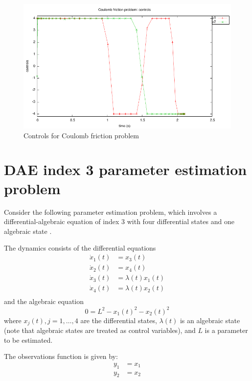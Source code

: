 \documentclass[a4paper,11pt]{report}    %
\begin{document}
\begin{figure}
  \centering
  \includegraphics{../examples/coulomb/coulomb_control}
  \caption{Controls for Coulomb friction problem}
 \label{fig:coulomb_controls}
\end{figure}

\section{DAE index 3 parameter estimation problem}

Consider the following parameter estimation problem, which involves a differential-algebraic equation
of index 3 with four differential states and one algebraic state \cite{Schittkowski:02}.  

The dynamics consists of the differential equations
\begin{equation}
\begin{aligned}
  \dot x_1(t) &= x_3(t) \\
  \dot x_2(t) &= x_4(t) \\
  \dot x_3(t) &= \lambda(t) x_1(t) \\
  \dot x_4(t) &= \lambda(t) x_2(t) \\
\end{aligned}
\end{equation}
and the algebraic equation
\begin{equation}
  0 = L^2 - x_1(t)^2 - x_2(t)^2
\end{equation}
where $x_j(t), j=1,\ldots,4$ are the differential states, $\lambda(t)$ is an algebraic state (note
that algebraic states are treated as control variables), and $L$ is a parameter to be estimated.

The observations function is given by:
\begin{equation}
 \begin{aligned}
   y_1 &= x_1 \\
   y_2 &= x_2 
 \end{aligned}
\end{equation}
\end{document}
